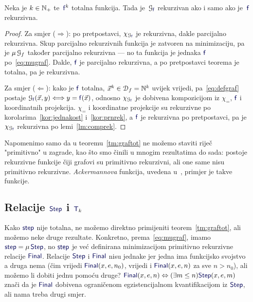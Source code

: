 \begin{teorem}\label{tm:graftot}
Neka je $k\in{\mathbb N}_+$ te\, $\f{f}^k$ totalna funkcija. Tada je\, $\graf{\f f}$ rekurzivan ako i samo ako je\, $\f f$ rekurzivna.
\end{teorem}
\begin{proof}
Za smjer ($\Rightarrow$): po pretpostavci, $\chi_{\graf{\f f}}$ je rekurzivna, dakle parcijalno rekurzivna. Skup parcijalno rekurzivnih funkcija je zatvoren na minimizaciju, pa je $\mu\,\mathcal G_{f}$ također parcijalno rekurzivna --- no ta funkcija je jednaka $\f f$ po~\eqref{eq:mugraf}. Dakle, $\f f$ je parcijalno rekurzivna, a po pretpostavci teorema je totalna, pa je rekurzivna.

Za smjer ($\Leftarrow$): kako je $\f f$ totalna, $\vec x^k\in\mathcal D_{f}={\mathbb N}^k$ uvijek vrijedi, pa~\eqref{eq:defgraf} postaje $\graf{\f f}(\vec x,y)\Longleftrightarrow y=\f f(\vec x)$, odnosno $\chi_{\graf{\f f}}$ je dobivena kompozicijom iz $\chi_=$, $\f f$ i koordinatnih projekcija. $\chi_=$ i koordinatne projekcije su rekurzivne po korolarima~\ref{kor:jednakost} i~\ref{kor:prnrek}, a $\f f$ je rekurzivna po pretpostavci, pa je $\chi_{\graf{\f f}}$ rekurzivna po lemi~\ref{lm:comprek}.
\end{proof}

Napomenimo samo da u teoremu~\ref{tm:graftot} ne možemo staviti riječ "primitivno" u zagrade, kao što smo činili u mnogim rezultatima do sada: postoje rekurzivne funkcije čiji grafovi su primitivno rekurzivni, ali one same nisu primitivno rekurzivne. \emph{Ackermannova} funkcija, uvedena u~\cite[dodatak]{skr:Vuk}, primjer je takve funkcije.

\subsection{Relacije \texorpdfstring{$\f{Step}$ i $\f T_k$}{Step i Tk}}

Kako $\f{step}$ nije totalna, ne možemo direktno primijeniti teorem~\ref{tm:graftot}, ali možemo neke druge rezultate. Konkretno, prema~\eqref{eq:mugraf}, imamo $\f{step}=\mu\,\f{Step}$, no $\f{step}$ je već definirana minimizacijom primitivno rekurzivne relacije $\f{Final}$. Relacije $\f{Step}$ i $\f{Final}$ nisu jednake jer jedna ima funkcijsko svojstvo a druga nema (čim vrijedi $\f{Final}(x,e,n_0)$, vrijedi i $\f{Final}(x,e,n)$ za sve $n>n_0$), ali možemo li dobiti jednu pomoću druge? $\f{Final}(x,e,n)\Leftrightarrow(\exists m\le n)\f{Step}(x,e,m)$ znači da je $\f{Final}$ dobivena ograničenom egzistencijalnom kvantifikacijom iz $\f{Step}$, ali nama treba drugi smjer.

